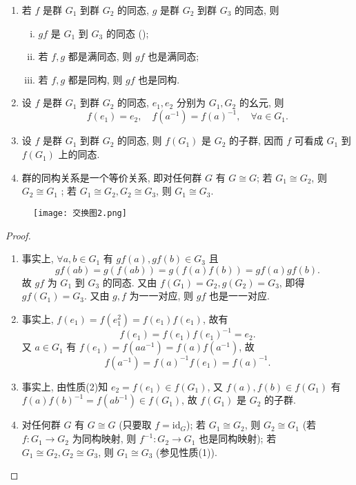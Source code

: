 \documentclass[../../main.tex]{subfiles}
\begin{document}
\begin{theorem}[群同态与同构的基本性质]
\begin{enumerate}[(1)]
\item 若 \( f \) 是群 \( G_1 \) 到群 \( G_2 \) 的同态, \( g \) 是群 \( G_2 \) 到群 \( G_3 \) 的同态, 则
\begin{enumerate}[(i)]
\item \( gf \) 是 \( G_1 \) 到 \( G_3 \) 的同态 ();
\item 若 \( f,g \) 都是满同态, 则 \( gf \) 也是满同态;
\item 若 \( f,g \) 都是同构, 则 \( gf \) 也是同构.
\end{enumerate}

\item 设 \( f \) 是群 \( G_1 \) 到群 \( G_2 \) 的同态, \( e_1,e_2 \) 分别为 \( G_1,G_2 \) 的幺元, 则
\[
f(e_1) = e_2, \quad f(a^{-1}) = f(a)^{-1}, \quad \forall a \in G_1.
\]

\item 设 \( f \) 是群 \( G_1 \) 到群 \( G_2 \) 的同态, 则 \( f(G_1) \) 是 \( G_2 \) 的子群, 因而 \( f \) 可看成 \( G_1 \) 到 \( f(G_1) \) 上的同态.

\item  群的同构关系是一个等价关系, 即对任何群 \( G \) 有 \( G \cong G \); 若 \( G_1 \cong G_2 \), 则 \( G_2 \cong G_1 \) ; 若 \( G_1 \cong G_2, G_2 \cong G_3 \), 则 \( G_1 \cong G_3 \).
\end{enumerate}
\end{theorem}
\begin{figure}[H]
\centering
\texttt{[image: 交换图2.png]}
\caption{}
\label{figure:{交换图2}}
\end{figure}
\begin{proof}
\begin{enumerate}[(1)]
\item 事实上, \( \forall a,b \in G_1 \) 有 \( gf(a), gf(b) \in G_3 \) 且
\[
gf(ab) = g(f(ab)) = g(f(a)f(b)) = gf(a)gf(b).
\]
故 \( gf \) 为 \( G_1 \) 到 \( G_3 \) 的同态. 又由 \( f(G_1) = G_2, g(G_2) = G_3 \), 即得 \( gf(G_1) = G_3 \). 又由 \( g,f \) 为一一对应, 则 \( gf \) 也是一一对应.

\item 事实上, \( f(e_1) = f(e_1^2) = f(e_1)f(e_1) \), 故有
\[
f(e_1) = f(e_1)f(e_1)^{-1} = e_2.
\]
又 \( a \in G_1 \) 有 \( f(e_1) = f(aa^{-1}) = f(a)f(a^{-1}) \), 故
\[
f(a^{-1}) = f(a)^{-1}f(e_1) = f(a)^{-1}.
\]

\item 事实上, 由性质(2)知 \( e_2 = f(e_1) \in f(G_1) \), 又 \( f(a),f(b) \in f(G_1) \) 有 \( f(a)f(b)^{-1} = f(ab^{-1}) \in f(G_1) \), 故 \( f(G_1) \) 是 \( G_2 \) 的子群.

\item 对任何群 \( G \) 有 \( G \cong G \) (只要取 \( f = \text{id}_G \)); 若 \( G_1 \cong G_2 \), 则 \( G_2 \cong G_1 \) (若 \( f: G_1 \to G_2 \) 为同构映射, 则 \( f^{-1}: G_2 \to G_1 \) 也是同构映射); 若 \( G_1 \cong G_2, G_2 \cong G_3 \), 则 \( G_1 \cong G_3 \) (参见性质(1)).
\end{enumerate}
\end{proof}
\end{document}
